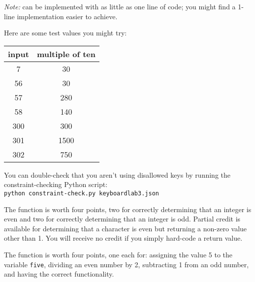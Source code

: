 \textit{Note: }  can be implemented with as little as one line of code;
you might find a 1-line implementation easier to achieve.

\begin{description}
\end{description}
Here are some test values you might try:

\begin{center}
    \begin{tabular}{cc}
        input   & multiple of ten \\ \hline
        7       & 30    \\
        56      & 30    \\
        57      & 280   \\
        58      & 140   \\
        300     & 300   \\
        301     & 1500  \\
        302     & 750   \\
    \end{tabular}
\end{center}

You can double-check that you aren't using disallowed keys by running the constraint-checking Python script: \\
\texttt{python constraint-check.py keyboardlab3.json}

The  function is worth four points, two for correctly determining that an integer is even and  two for correctly determining that an integer is odd.
Partial credit is available for determining that a character is even but returning a non-zero value other than 1.
You will receive no credit if you simply hard-code a return value.

The  function is worth four points, one each for: assigning the value 5 to the variable \lstinline{five}, dividing an even number by 2, subtracting 1 from an odd number, and having the correct functionality.
